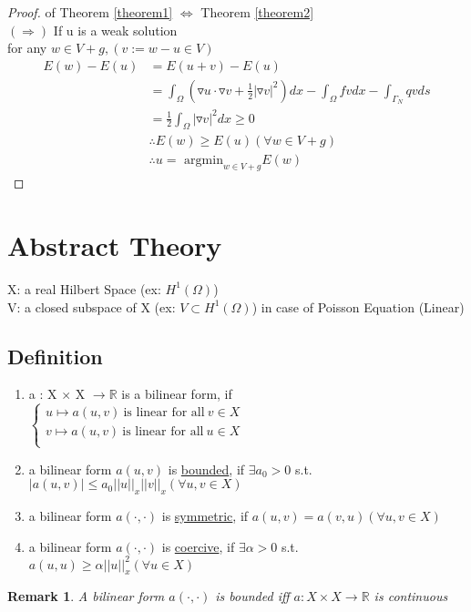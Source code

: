 \documentclass[a4paper,12pt]{article}
\newtheorem{remark}{Remark}[]
\newcommand{\R}{\mathbb{R}}
\begin{document}
\begin{proof} of Theorem \ref{theorem1} $\Leftrightarrow$ Theorem \ref{theorem2}\\
	$(\Rightarrow)$ If u is a weak solution\\
	for any $w\in V+g,(v:= w-u \in V)$\\
	\begin{equation}\nonumber
	\begin{aligned}
	E(w) - E(u) &= E(u+v) - E(u)\\
	&= \int_\Omega(\triangledown u \cdot \triangledown v + \frac{1}{2} |\triangledown v|^2) dx - \int_\Omega fv dx -\int_{\Gamma_N} qv ds\\
	&= \frac{1}{2} \int_\Omega |\triangledown v|^2 dx \geq 0\\
	&\therefore E(w) \geq E(u) (\forall w \in V+g)\\
	&\therefore u = \text{ argmin}_{w\in V+g} E(w)
	\end{aligned}
	\end{equation}
\end{proof}
\section{Abstract Theory}
X: a real Hilbert Space (ex: $H^1(\Omega)$)\\
V: a closed subspace of X (ex: $V \subset H^1(\Omega)$) in case of Poisson Equation (Linear)
\subsection{Definition}
\begin{enumerate}
	\item a : X $\times$ X $\rightarrow \R$ is a bilinear form, if\\
	$\begin{cases}
	u \mapsto a(u,v)\ \text{is linear for all}\ v \in X\\
	v \mapsto a(u,v)\ \text{is linear for all}\ u \in X\\
	\end{cases}$
	\item a bilinear form $a(u,v)$ is \underline{bounded}, if $\exists a_0>0$ s.t. $|a(u,v)| \leq a_0 ||u||_x ||v||_x (\forall u,v\in X)$
	\item a bilinear form $a(\cdot,\cdot)$ is \underline{symmetric}, if $a(u,v) = a(v,u)(\forall u,v \in X)$
	\item a bilinear form $a(\cdot,\cdot)$ is \underline{coercive}, if $\exists \alpha > 0$ s.t. $a(u,u)\geq \alpha ||u||^2_x (\forall u \in X)$
\end{enumerate}
\begin{remark}
	A bilinear form $a(\cdot,\cdot)$ is bounded iff $a: X \times X \rightarrow \R$ is continuous
\end{remark}
\end{document}
